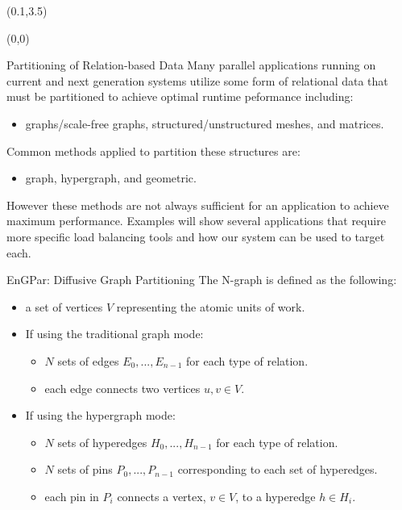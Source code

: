 \documentclass{beamer}
\begin{document}
\begin{textblock}{15.6}(0.1,3.5)
  \begin{textblock}{5}(0,0)
    \begin{block}{\centering Partitioning of Relation-based Data}
      Many parallel applications running on current and next generation systems utilize some form of relational data that must be partitioned to achieve optimal runtime peformance including:
      \begin{itemize}
      \item graphs/scale-free graphs, structured/unstructured meshes, and matrices.
      \end{itemize}
      Common methods applied to partition these structures are:
      \begin{itemize}
      \item graph, hypergraph, and geometric.
      \end{itemize}
      However these methods are not always sufficient for an application to achieve maximum performance. Examples will show several applications that require more specific load balancing tools and how our system can be used to target each.
    \end{block}
    \begin{block}{\centering EnGPar: Diffusive Graph Partitioning}
      The N-graph is defined as the following:
      \begin{itemize}
      \item a set of vertices $V$ representing the atomic units of work.
      \item If using the traditional graph mode:
        \begin{itemize}
        \item $N$ sets of edges $E_0,...,E_{n-1}$ for each type of relation.
        \item each edge connects two vertices $u,v \in V$.
        \end{itemize}
      \item If using the hypergraph mode:
        \begin{itemize}
        \item $N$ sets of hyperedges $H_0,...,H_{n-1}$ for each type of relation.
        \item $N$ sets of pins $P_0,...,P_{n-1}$ corresponding to each set of hyperedges.
        \item each pin in $P_i$ connects a vertex, $v \in V$, to a hyperedge $h \in H_i$.
        \end{itemize}
      \end{itemize}


\end{block}
\end{textblock}
\end{textblock}
\end{document}

